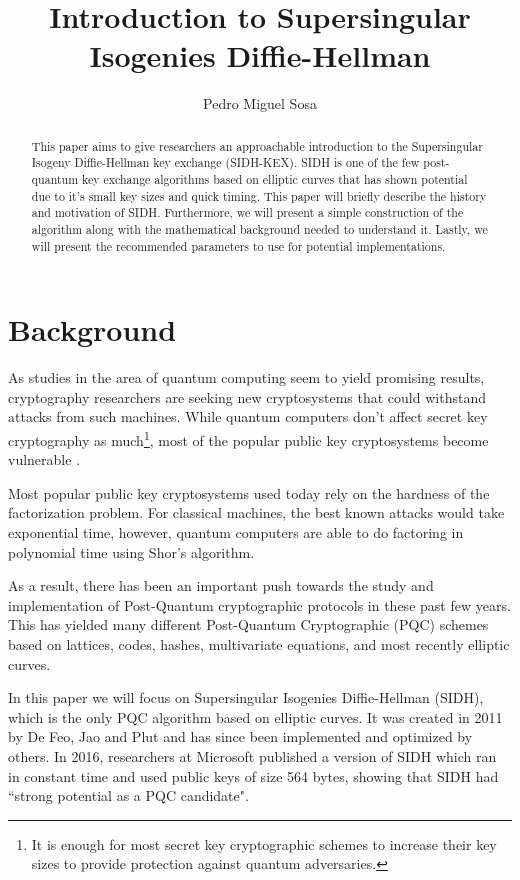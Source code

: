 \documentclass[10pt,twocolumn]{article} %
\title{Introduction to Supersingular Isogenies Diffie-Hellman}
\author{Pedro Miguel Sosa}
\begin{document}
\maketitle

\begin{abstract}
This paper aims to give researchers an approachable introduction to the Supersingular Isogeny Diffie-Hellman key exchange (SIDH-KEX). SIDH is one of the few post-quantum key exchange algorithms based on elliptic curves that has shown potential due to it's small key sizes and quick timing. This paper will briefly describe the history and motivation of SIDH. Furthermore, we will present a simple construction of the algorithm along with the mathematical background needed to understand it. Lastly, we will present the recommended parameters to use for potential implementations.
\end{abstract}

\section{Background}
As studies in the area of quantum computing seem to yield promising results, cryptography researchers are seeking new cryptosystems that could withstand attacks from such machines. While quantum computers don't affect secret key cryptography as much\footnote{It is enough for most secret key cryptographic schemes to increase their key sizes to provide protection against quantum adversaries.}, most of the popular public key cryptosystems become vulnerable \cite{bernstein2009introduction}. 
\par Most popular public key cryptosystems used today rely on the hardness of the factorization problem. For classical machines, the best known attacks would take exponential time, however, quantum computers are able to do factoring in polynomial time using Shor's algorithm.
\par As a result, there has been an important push towards the study and implementation of Post-Quantum cryptographic protocols in these past few years. This has yielded many different Post-Quantum Cryptographic (PQC) schemes based on lattices, codes, hashes, multivariate equations, and most recently elliptic curves.
\par In this paper we will focus on Supersingular Isogenies Diffie-Hellman (SIDH), which is the only PQC algorithm based on elliptic curves. It was created in 2011 by De Feo, Jao and Plut \cite{Jao2011} and has since been implemented and optimized by others. In 2016, researchers at Microsoft published a version of SIDH which ran in constant time and used public keys of size 564 bytes, showing that SIDH had ``strong potential as a PQC candidate"\cite{costello2016}.
\end{document}
